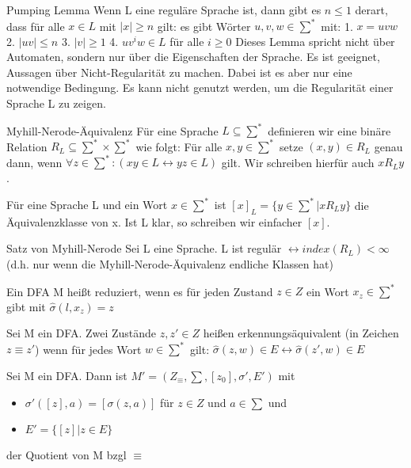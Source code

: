 \documentclass[avery5371]{flashcards}
\begin{document}
\begin{flashcard}[]{Pumping Lemma}
Wenn L eine reguläre Sprache ist, dann gibt es $n\leq 1$ derart, dass für alle $x\in L$ mit $|x|\geq n$ gilt: es gibt Wörter $u,v,w \in \sum^*$ mit:
1. $x=uvw$
2. $|uv|\leq n$
3. $|v|\geq 1$
4. $uv^i w\in L$ für alle $i\geq 0$
Dieses Lemma spricht nicht über Automaten, sondern nur über die Eigenschaften der Sprache. Es ist geeignet, Aussagen über Nicht-Regularität zu machen. Dabei ist es aber nur eine notwendige Bedingung. Es kann nicht genutzt werden, um die Regularität einer Sprache L zu zeigen.
\end{flashcard}


\begin{flashcard}[Definition]{Myhill-Nerode-Äquivalenz} Für eine Sprache $L\subseteq \sum^*$ definieren wir eine binäre Relation $R_L \subseteq \sum^* \times \sum^*$ wie folgt: Für alle $x,y\in \sum^*$ setze $(x,y)\in R_L$ genau dann, wenn $\forall z \in \sum^* :(xy\in L \leftrightarrow yz \in L)$ gilt. Wir schreiben hierfür auch $x R_L y$.
\end{flashcard}

\begin{flashcard}[Definition]{ Für eine Sprache L und ein Wort $x\in \sum^*$ ist $[x]_L=\{y\in\sum^* | x R_L y \}$ }die Äquivalenzklasse von x. Ist L klar, so schreiben wir einfacher $[x]$.
\end{flashcard}

\begin{flashcard}[Satz]{ Satz  von Myhill-Nerode} Sei L eine Sprache. L ist regulär $\leftrightarrow index(R_L)< \infty$
(d.h. nur wenn die Myhill-Nerode-Äquivalenz endliche Klassen hat)
\end{flashcard}

\begin{flashcard}[Definition]{ Ein DFA M heißt reduziert,} wenn es für jeden Zustand $z \in Z$ ein Wort $x_z\in \sum^*$ gibt mit $\hat{\sigma}(l, x_z)=z$
\end{flashcard}

\begin{flashcard}[Definition]{ Sei M ein DFA. Zwei Zustände $z,z'\in Z$ heißen erkennungsäquivalent }(in Zeichen $z\equiv z'$) wenn für jedes Wort $w\in \sum^*$ gilt: $\hat{\sigma}(z,w)\in E \leftrightarrow \hat{\sigma}(z',w)\in E$
\end{flashcard}

\begin{flashcard}[Definition]{ Sei M ein DFA. Dann ist $M'=(Z_{\equiv},\sum, [z_0],\sigma', E')$ mit}\begin{itemize}
\item $\sigma'([z],a)=[\sigma (z,a)]$ für $z\in Z$ und $a\in \sum$ und
\item $E'=\{[z]|z\in E\}$
\end{itemize}
der Quotient von M bzgl $\equiv$
\end{flashcard}
\end{document}
